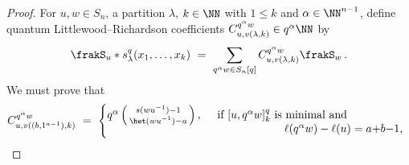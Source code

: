 \begin{proof}
    For  $u,w \in S_n$, a partition $\lambda$, $k \in \NN$ with $1\leq k$ and $\alpha\in \NN^{n-1}$, define
    quantum Littlewood--Richardson coefficients $C^{q^\alpha w}_{u,v(\lambda,k)}\in q^\alpha \NN$ by 
    \begin{equation}
        \label{eq-definition-Cq}
        \frakS_u \ast s^q_\lambda(x_1, \ldots, x_k)
        \ =\ \sum_{q^\alpha w \in S_n[q]} C^{q^\alpha w}_{u,v(\lambda,k)} \frakS_w\,.
    \end{equation}
    We must prove that
    \begin{equation*}
        C^{q^\alpha w}_{u,v((b, 1^{a-1}),k)}\ =\ 
        \begin{cases}
            q^\alpha \left(\begin{smallmatrix} s(wu^{-1})-1 \\ \het(wu^{-1})-a \end{smallmatrix}\right),
            &
            \begin{array}[t]{lr}
                \text{if $[u, q^{\alpha}w]_k^q$ is minimal and} \\[-0.5ex]
                \qquad\qquad\qquad \text{$\ell(q^\alpha w) - \ell(u) = a{+}b{-}1$,}
            \end{array}
            

\end{cases}
\end{equation*}
\end{proof}
